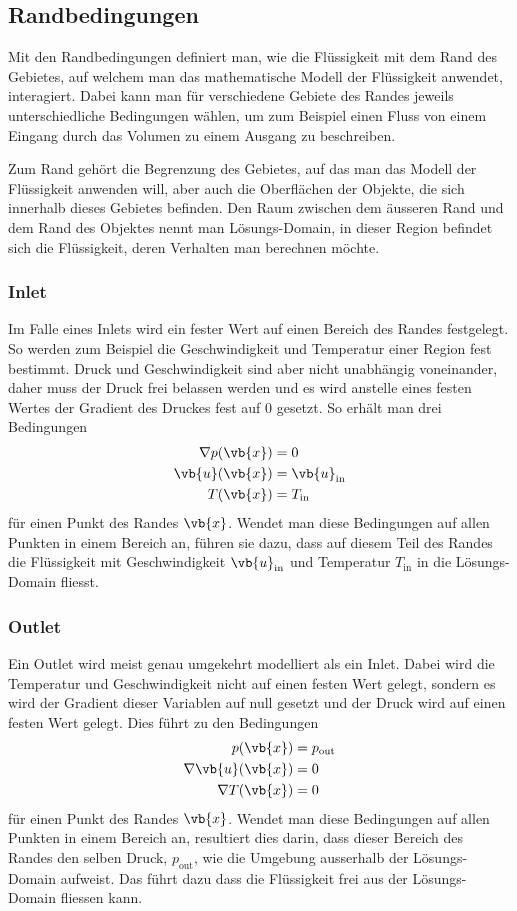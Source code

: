 \subsection{Randbedingungen}
\label{openfoam:randbedingungen}
Mit den Randbedingungen definiert man, wie die Flüssigkeit mit dem Rand des Gebietes, auf welchem man das mathematische Modell der Flüssigkeit anwendet, interagiert.
Dabei kann man für verschiedene Gebiete des Randes jeweils unterschiedliche Bedingungen wählen, um zum Beispiel einen Fluss von einem Eingang durch das Volumen zu einem Ausgang zu beschreiben.

Zum Rand gehört die Begrenzung des Gebietes, auf das man das Modell der Flüssigkeit anwenden will, aber auch die Oberflächen der Objekte, die sich innerhalb dieses Gebietes befinden.
Den Raum zwischen dem äusseren Rand und dem Rand des Objektes nennt man Lösungs-Domain, in dieser Region befindet sich die Flüssigkeit, deren Verhalten man berechnen möchte.

\subsubsection{Inlet}
Im Falle eines Inlets wird ein fester Wert auf einen Bereich des Randes festgelegt. 
So werden zum Beispiel die Geschwindigkeit und Temperatur einer Region fest bestimmt.
Druck und Geschwindigkeit sind aber nicht unabhängig voneinander, daher muss der Druck frei belassen werden und es wird anstelle eines festen Wertes der Gradient des Druckes fest auf 0 gesetzt.
So erhält man drei Bedingungen 
\begin{align*}
 \nabla p(\vb{x}) &= 0 \\
 \vb{u}(\vb{x}) &= \vb{u}_{\text{in}} \\
 T(\vb{x}) &= T_{\text{in}}
\end{align*}
für einen Punkt des Randes $\vb{x}$.
Wendet man diese Bedingungen auf allen Punkten in einem Bereich an, führen sie dazu, dass auf diesem Teil des Randes die Flüssigkeit mit Geschwindigkeit $\vb{u}_{\text{in}}$ und Temperatur $T_{\text{in}}$ in die Lösungs-Domain fliesst.

\subsubsection{Outlet}
Ein Outlet wird meist genau umgekehrt modelliert als ein Inlet.
Dabei wird die Temperatur und Geschwindigkeit nicht auf einen festen Wert gelegt, sondern es wird der Gradient dieser Variablen auf null gesetzt und der Druck wird auf einen festen Wert gelegt.
Dies führt zu den Bedingungen
\begin{align*}
 p(\vb{x}) &= p_{\text{out}} \\
 \nabla\vb{u}(\vb{x}) &= 0 \\
 \nabla T(\vb{x}) &= 0
\end{align*}
für einen Punkt des Randes $\vb{x}$.
Wendet man diese Bedingungen auf allen Punkten in einem Bereich an, resultiert dies darin, dass dieser Bereich des Randes den selben Druck, $p_{\text{out}}$,  wie die Umgebung ausserhalb der Lösungs-Domain aufweist.
Das führt dazu dass die Flüssigkeit frei aus der Lösungs-Domain fliessen kann.


